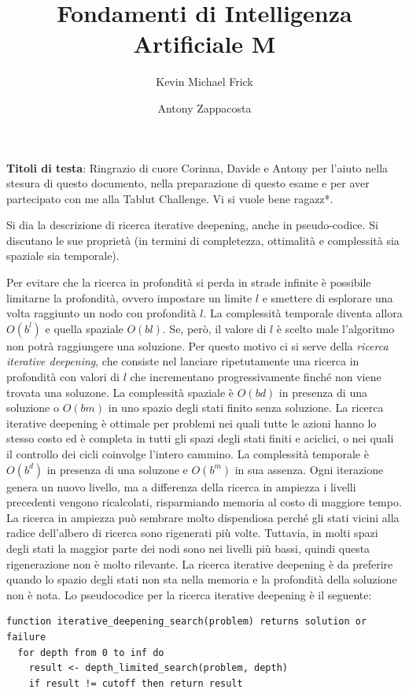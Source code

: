 \documentclass[answers, a4paper, 11pt]{exam}
\title{Fondamenti di Intelligenza Artificiale M}
\author{Kevin Michael Frick \and Antony Zappacosta}
\begin{document}
\maketitle
\textbf{Titoli di testa}: Ringrazio di cuore Corinna, Davide e Antony per l’aiuto nella stesura di questo documento, nella preparazione di questo esame e per aver partecipato con me alla Tablut Challenge. Vi si vuole bene ragazz*.
\begin{questions}
\question Si dia la descrizione di ricerca iterative deepening, anche in pseudo-codice. Si discutano le sue
proprietà (in termini di completezza, ottimalità e complessità sia spaziale sia temporale).
	\begin{solution}
		Per evitare che la ricerca in profondità si perda in strade infinite è possibile limitarne la profondità, ovvero impostare un limite $l$ e smettere di esplorare una volta raggiunto un nodo con profondità $l$.
		La complessità temporale diventa allora $O(b^l)$ e quella spaziale $O(bl)$. 
		Se, però, il valore di $l$ è scelto male l'algoritmo non potrà raggiungere una soluzione. 
		Per questo motivo ci si serve della \emph{ricerca iterative deepening}, che consiste nel lanciare ripetutamente una ricerca in profondità con valori di $l$ che incrementano progressivamente finché non viene trovata una soluzone. 
		La complessità spaziale è $O(bd)$ in presenza di una soluzione o $O(bm)$ in uno spazio degli stati finito senza soluzione. 
		La ricerca iterative deepening è ottimale per problemi nei quali tutte le azioni hanno lo stesso costo ed è completa in tutti gli spazi degli stati finiti e aciclici, o nei quali il controllo dei cicli coinvolge l'intero cammino. 
		La complessità temporale è $O(b^d)$ in presenza di una soluzone e $O(b^m)$ in sua assenza. 
		Ogni iterazione genera un nuovo livello, ma a differenza della ricerca in ampiezza i livelli precedenti vengono ricalcolati, risparmiando memoria al costo di maggiore tempo. 
		La ricerca in ampiezza può sembrare molto dispendiosa perché gli stati vicini alla radice dell'albero di ricerca sono rigenerati più volte. 
		Tuttavia, in molti spazi degli stati la maggior parte dei nodi sono nei livelli più bassi, quindi questa rigenerazione non è molto rilevante. 
		La ricerca iterative deepening è da preferire quando lo spazio degli stati non sta nella memoria e la profondità della soluzione non è nota. 
	Lo pseudocodice per la ricerca iterative deepening è il seguente:
\begin{verbatim}
function iterative_deepening_search(problem) returns solution or failure
  for depth from 0 to inf do
    result <- depth_limited_search(problem, depth)
    if result != cutoff then return result


\end{verbatim}
\end{solution}
\end{questions}
\end{document}
